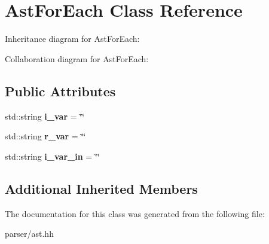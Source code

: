 \hypertarget{classAstForEach}{}\section{Ast\+For\+Each Class Reference}
\label{classAstForEach}


Inheritance diagram for Ast\+For\+Each\+:


Collaboration diagram for Ast\+For\+Each\+:
\subsection*{Public Attributes}
\begin{DoxyCompactItemize}
\item 
\mbox{\label{classAstForEach_a966f2c0c54cda9aee9083e69f8a5b615}} 
std\+::string {\bfseries i\+\_\+var} = \char`\"{}\char`\"{}
\item 
\mbox{\label{classAstForEach_aa47937591cd03931f3223a1269e8505c}} 
std\+::string {\bfseries r\+\_\+var} = \char`\"{}\char`\"{}
\item 
\mbox{\label{classAstForEach_a313f73d6a4256373fc26f8b84980cc03}} 
std\+::string {\bfseries i\+\_\+var\+\_\+in} = \char`\"{}\char`\"{}
\end{DoxyCompactItemize}
\subsection*{Additional Inherited Members}


The documentation for this class was generated from the following file\+:\begin{DoxyCompactItemize}
\item 
parser/ast.\+hh\end{DoxyCompactItemize}
